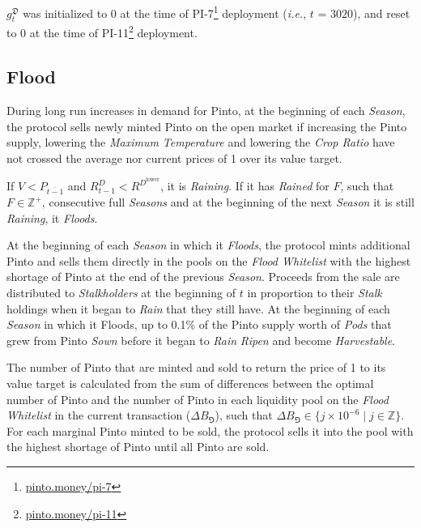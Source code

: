 \documentclass[tikz]{article}
\makeatletter
\newenvironment{keepunit}{%
  \par\penalty0\begingroup
  \edef\keepunitparskip{\the\parskip}%
  \noindent\begin{minipage}[t]{\linewidth}%
  \setlength{\parskip}{\keepunitparskip}%
  \@minipagefalse
}{%
  \end{minipage}\par\endgroup
}
\newcommand{\term}[1]{\textsl{#1}}
\newcommand{\fref}[1]{\footnote{\href{http://#1}{#1}}}
\newcommand{\Pinto}{} %
\renewcommand{\Pinto}{\usebox{\cachePinto}}
\makeatother
\begin{document}
$g_t^{\mathfrak{D}}$ was initialized to $0$ at the time of PI-7\fref{pinto.money/pi-7} deployment (\textit{i.e.}, $t$ = $3020$), and reset to $0$ at the time of PI-11\fref{pinto.money/pi-11} deployment.



\begin{keepunit}
\vspace{-0.15cm}
\subsection{Flood}
\vspace{-0.15cm}

During long run increases in demand for Pinto, at the beginning of each \term{Season}, the protocol sells newly minted Pinto on the open market if increasing the Pinto supply, lowering the \term{Maximum Temperature} and lowering the \term{Crop Ratio} have not crossed the average nor current prices of \Pinto1 over its value target.
\end{keepunit}

\vspace{-0.05cm}

If $V < P_{\overline{t-1}}$ and $R_{t-1}^{D} < R^{D^{\text{lower}}}$, it is \term{Raining}. If it has \term{Rained} for $F$, such that $F \in \mathbb{Z}^{+}$, consecutive full \term{Seasons} and at the beginning of the next \term{Season} it is still \term{Raining}, it \term{Floods}. 

\vspace{-0.05cm}

At the beginning of each \term{Season} in which it \term{Floods}, the protocol mints additional Pinto and sells them directly in the pools on the \term{Flood Whitelist} with the highest shortage of Pinto at the end of the previous \term{Season}. Proceeds from the sale are distributed to \term{Stalkholders} at the beginning of $t$ in proportion to their \term{Stalk} holdings when it began to \term{Rain} that they still have. At the beginning of each \term{Season} in which it Floods, up to 0.1\% of the Pinto supply worth of \term{Pods} that grew from Pinto \term{Sown} before it began to \term{Rain} \term{Ripen} and become \term{Harvestable}.

\vspace{-0.05cm}

The number of Pinto that are minted and sold to return the price of \Pinto1 to its value target is calculated from the sum of differences between the optimal number of Pinto and the number of Pinto in each liquidity pool on the \term{Flood Whitelist} in the current transaction ($\Delta B_{\Game}$), such that $\Delta B_{\Game} \in \{j \times 10^{-6} \mid j \in \mathbb{Z} \}$. For each marginal Pinto minted to be sold, the protocol sells it into the pool with the highest shortage of Pinto until all Pinto are sold.
\end{document}
